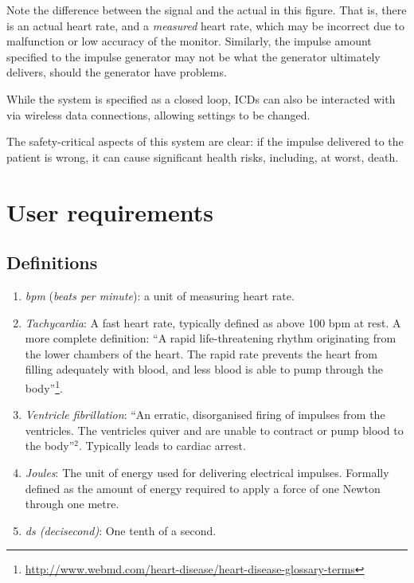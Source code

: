 \documentclass[11pt]{article}
\begin{document}
Note the difference between the signal and the actual in this figure. That is, there is an actual heart rate, and a \emph{measured} heart rate, which may be incorrect due to malfunction or low accuracy of the monitor. Similarly, the impulse amount specified to the impulse generator may not be what the generator ultimately delivers, should the generator have problems.

While the system is specified as a closed loop, ICDs can also be interacted with via wireless data connections, allowing settings to be changed.

The safety-critical aspects of this system are clear: if the impulse delivered to the patient is wrong, it can cause significant health risks, including, at worst, death. 

\section{User requirements}
\label{sec:user-requirements}

\subsection{Definitions}

\begin{enumerate}[~~\bf{D}1]

 \item \emph{bpm} (\emph{beats per minute}): a unit of measuring heart rate.

 \item \emph{Tachycardia}: A fast heart rate, typically defined as above 100 bpm at rest. A more complete definition: ``A rapid life-threatening rhythm originating from the lower chambers of the heart. The rapid rate prevents the heart from filling adequately with blood, and less blood is able to pump through the body''\footnote{\url{http://www.webmd.com/heart-disease/heart-disease-glossary-terms}}.


 \item \emph{Ventricle fibrillation}: ``An erratic, disorganised firing of impulses from the ventricles. The ventricles quiver and are unable to contract or pump blood to the body''$^2$. Typically leads to cardiac arrest.

 \item \emph{Joules}: The unit of energy used for delivering electrical impulses. Formally defined as the amount of energy required to apply a force of one Newton through one metre.

 \item \emph{ds (decisecond)}: One tenth of a second.

\end{enumerate}
\end{document}
